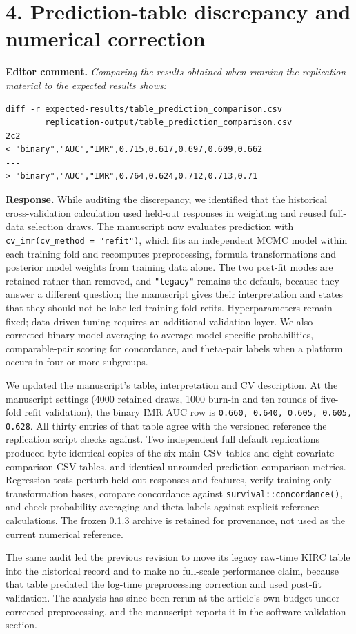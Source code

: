 \documentclass[11pt]{article}
\newcommand{\code}[1]{\texttt{#1}}
\newenvironment{editorcomment}
  {\par\smallskip\sloppy\noindent\textbf{Editor comment.}\itshape}
  {\par\smallskip\fussy}
\newenvironment{response}
  {\noindent\textbf{Response.}}
  {\par\smallskip}
\begin{document}
\section*{4. Prediction-table discrepancy and numerical correction}
\begin{editorcomment}
Comparing the results obtained when running the replication material to the
expected results shows:
\begin{verbatim}
diff -r expected-results/table_prediction_comparison.csv
        replication-output/table_prediction_comparison.csv
2c2
< "binary","AUC","IMR",0.715,0.617,0.697,0.609,0.662
---
> "binary","AUC","IMR",0.764,0.624,0.712,0.713,0.71
\end{verbatim}
\end{editorcomment}
\begin{response}
While auditing the discrepancy, we identified that the historical cross-validation
calculation used held-out responses in weighting and reused full-data selection
draws. The manuscript now evaluates prediction with
\code{cv\_imr(cv\_method = "refit")}, which fits an independent MCMC model
within each training fold and recomputes preprocessing, formula transformations
and posterior model weights from training data alone. The two post-fit modes
are retained rather than removed, and \code{"legacy"} remains the default,
because they answer a different question; the manuscript gives their
interpretation and states that they should not be labelled training-fold
refits. Hyperparameters remain fixed; data-driven tuning requires an
additional validation layer. We also corrected binary model averaging to
average model-specific probabilities, comparable-pair scoring for concordance,
and theta-pair labels when a platform occurs in four or more subgroups.

We updated the manuscript's table, interpretation and CV description. At the
manuscript settings (4000 retained draws, 1000 burn-in and ten rounds of
five-fold refit validation), the binary IMR AUC row is
\code{0.660, 0.640, 0.605, 0.605, 0.628}. All thirty entries of that table
agree with the versioned reference the replication script checks against. Two
independent full default replications produced byte-identical copies of the six
main CSV tables and eight covariate-comparison CSV tables, and identical
unrounded prediction-comparison metrics. Regression tests perturb held-out
responses and features, verify training-only transformation bases, compare
concordance against \code{survival::concordance()}, and check probability
averaging and theta labels against explicit reference calculations. The frozen
0.1.3 archive is retained for provenance, not used as the current numerical
reference.

The same audit led the previous revision to move its legacy raw-time KIRC
table into the historical record and to make no full-scale performance claim,
because that table predated the log-time preprocessing correction and used
post-fit validation. The analysis has since been rerun at the article's own
budget under corrected preprocessing, and the manuscript reports it in the
software validation section.
\end{response}
\end{document}
